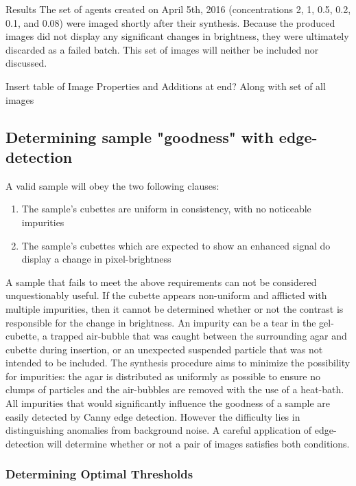\documentclass[a4paper,12pt]{article}
\begin{document}
\begin{section}{Results}
The set of agents created on April 5th, 2016 (concentrations 2, 1, 0.5, 0.2, 0.1, and 0.08) were imaged shortly after their synthesis. Because the produced images did not display any significant changes in brightness, they were ultimately discarded as a failed batch. This set of images will neither be included nor discussed. 

Insert table of Image Properties and Additions at end? Along with set of all images

\subsection{Determining sample "goodness" with edge-detection}

A valid sample will obey the two following clauses: 

\singlespacing
\begin{enumerate}
\item The sample's cubettes are uniform in consistency, with no noticeable impurities
\item The sample's cubettes which are expected to show an enhanced signal do display a change in pixel-brightness
\end{enumerate}
\doublespacing

A sample that fails to meet the above requirements can not be considered unquestionably useful. If the cubette appears non-uniform and afflicted with multiple impurities, then it cannot be determined whether or not the contrast is responsible for the change in brightness. An impurity can be a tear in the gel-cubette, a trapped air-bubble that was caught between the surrounding agar and cubette during insertion, or an unexpected suspended particle that was not intended to be included. The synthesis procedure aims to minimize the possibility for impurities: the agar is distributed as uniformly as possible to ensure no clumps of particles and the air-bubbles are removed with the use of a heat-bath. All impurities that would significantly influence the goodness of a sample are easily detected by Canny edge detection. However the difficulty lies in distinguishing anomalies from background noise. A careful application of edge-detection will determine whether or not a pair of images satisfies both conditions. 

\subsubsection{Determining Optimal Thresholds}



\end{section}
\end{document}
